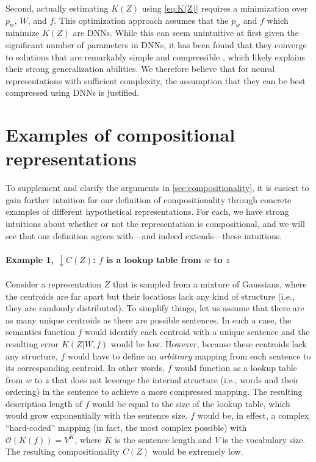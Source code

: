 \documentclass{article}
\begin{document}
\begin{appendices}
Second, actually estimating $K(Z)$ using \cref{eq:K(Z)} requires a minimization over $p_w$, $W$, and $f$. This optimization approach assumes that the $p_w$ and $f$ which minimize $K(Z)$ are DNNs. While this can seem unintuitive at first given the significant number of parameters in DNNs, it has been found that they converge to solutions that are remarkably simple and compressible \citep{blier2018description,goldblum2023no,sutskever2023observation,rae2023compression}, which likely explains their strong generalization abilities. We therefore believe that for neural representations with sufficient complexity, the assumption that they can be best compressed using DNNs is justified.

\section{Examples of compositional representations}
\label{sec:C(Z)_examples}

To supplement and clarify the arguments in \cref{sec:compositionality}, it is easiest to gain further intuition for our definition of compositionality through concrete examples of different hypothetical representations. For each, we have strong intuitions about whether or not the representation is compositional, and we will see that our definition agrees with---and indeed extends---these intuitions.

\paragraph{Example 1, $\downarrow C(Z)$: $f$ is a lookup table from $w$ to $z$}

Consider a representation $Z$ that is sampled from a mixture of Gaussians, where the centroids are far apart but their locations lack any kind of structure (i.e., they are randomly distributed). To simplify things, let us assume that there are as many unique centroids as there are possible sentences. In such a case, the semantics function $f$ would identify each centroid with a unique sentence and the resulting error $K(Z|W,f)$ would be low. However, because these centroids lack any structure, $f$ would have to define an \emph{arbitrary} mapping from each sentence to its corresponding centroid. In other words, $f$ would function as a lookup table from $w$ to $z$ that does not leverage the internal structure (i.e., words and their ordering) in the sentence to achieve a more compressed mapping. The resulting description length of $f$ would be equal to the size of the lookup table, which would grow exponentially with the sentence size. $f$ would be, in effect, a complex ``hard-coded'' mapping (in fact, the most complex possible) with $\mathcal{O}(K(f)) = V^K$, where $K$ is the sentence length and $V$ is the vocabulary size. The resulting compositionality $C(Z)$ would be extremely low.


\end{appendices}
\end{document}
